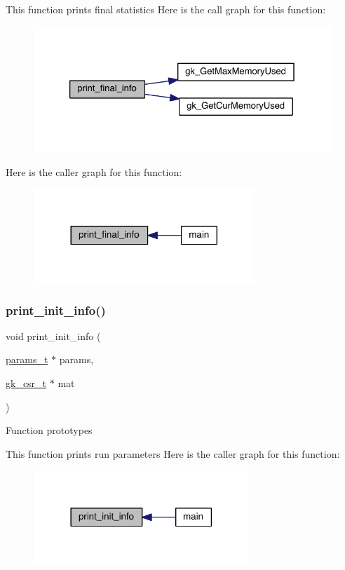 This function prints final statistics Here is the call graph for this function\+:\nopagebreak
\begin{figure}[H]
\begin{center}
\leavevmode
\includegraphics[width=326pt]{a00864_a702976a4c55992ddbfc1918ec1b70943_cgraph}
\end{center}
\end{figure}
Here is the caller graph for this function\+:\nopagebreak
\begin{figure}[H]
\begin{center}
\leavevmode
\includegraphics[width=236pt]{a00864_a702976a4c55992ddbfc1918ec1b70943_icgraph}
\end{center}
\end{figure}
\mbox{\label{a00864_a2270624f104a1d261314dd112e4a1d1d}} 
\subsubsection{\texorpdfstring{print\+\_\+init\+\_\+info()}{print\_init\_info()}}
{\footnotesize\ttfamily void print\+\_\+init\+\_\+info (\begin{DoxyParamCaption}\item[{\hyperlink{a00706}{params\+\_\+t} $\ast$}]{params,  }\item[{\hyperlink{a00634}{gk\+\_\+csr\+\_\+t} $\ast$}]{mat }\end{DoxyParamCaption})}

Function prototypes

This function prints run parameters Here is the caller graph for this function\+:\nopagebreak
\begin{figure}[H]
\begin{center}
\leavevmode
\includegraphics[width=230pt]{a00864_a2270624f104a1d261314dd112e4a1d1d_icgraph}
\end{center}
\end{figure}
